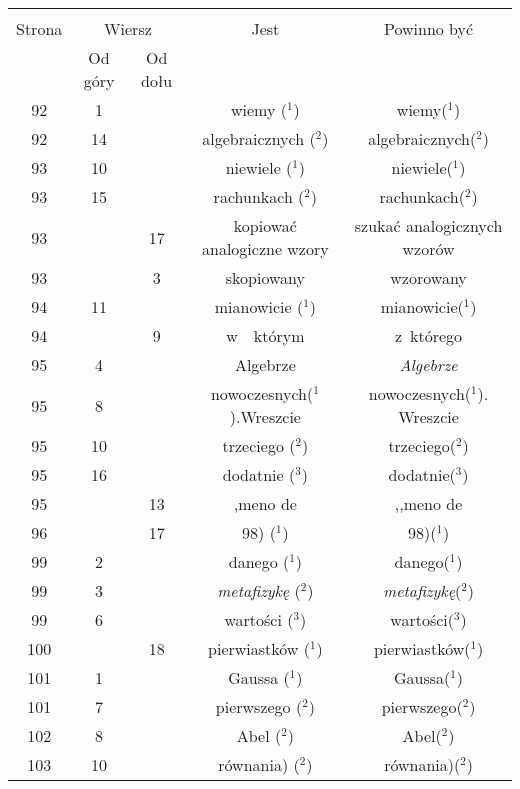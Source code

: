 \documentclass[a4paper,11pt]{article}
\begin{document}
\begin{center}
  \begin{tabular}{|c|c|c|c|c|}
    \hline
    & \multicolumn{2}{c|}{} & & \\
    Strona & \multicolumn{2}{c|}{Wiersz} & Jest
                              & Powinno być \\ \cline{2-3}
    & Od góry & Od dołu & & \\
    \hline
    92  &  1 & & wiemy ($^{ 1 }$) & wiemy($^{ 1 }$) \\
    92  & 14 & & algebraicznych ($^{ 2 }$) & algebraicznych($^{ 2 }$) \\
    93  & 10 & & niewiele ($^{ 1 }$) & niewiele($^{ 1 }$) \\
    93  & 15 & & rachunkach ($^{ 2 }$) & rachunkach($^{ 2 }$) \\
    93  & & 17 & kopiować analogiczne wzory & szukać analogicznych
                                              wzorów \\
    93  & &  3 & skopiowany & wzorowany \\
    94  & 11 & & mianowicie ($^{ 1 }$) & mianowicie($^{ 1 }$) \\
    94  & &  9 & w~~którym & z~którego \\
    95  &  4 & & Algebrze & \emph{Algebrze} \\
    95  &  8 & & nowoczesnych($^{ 1 }$).Wreszcie
           & nowoczesnych($^{ 1 }$). Wreszcie \\
    95  & 10 & & trzeciego ($^{ 2 }$) & trzeciego($^{ 2 }$) \\
    95  & 16 & & dodatnie ($^{ 3 }$) & dodatnie($^{ 3 }$) \\
    95  & & 13 & ,meno de & ,,meno de  %
    \\
    96  & & 17 & 98) ($^{ 1 }$) & 98)($^{ 1 }$) \\
    99  &  2 & & danego ($^{ 1 }$) & danego($^{ 1 }$) \\
    99  &  3 & & \emph{metafizykę} ($^{ 2 }$) & \emph{metafizykę}($^{ 2 }$) \\
    99  &  6 & & wartości ($^{ 3 }$) & wartości($^{ 3 }$) \\
    100 & & 18 & pierwiastków ($^{ 1 }$) & pierwiastków($^{ 1 }$) \\
    101 &  1 & & Gaussa ($^{ 1 }$) & Gaussa($^{ 1 }$) \\
    101 &  7 & & pierwszego ($^{ 2 }$) & pierwszego($^{ 2 }$) \\
    102 &  8 & & Abel ($^{ 2 }$) & Abel($^{ 2 }$) \\
    103 & 10 & & równania) ($^{ 2 }$) & równania)($^{ 2 }$) \\

\end{tabular}
\end{center}
\end{document}
